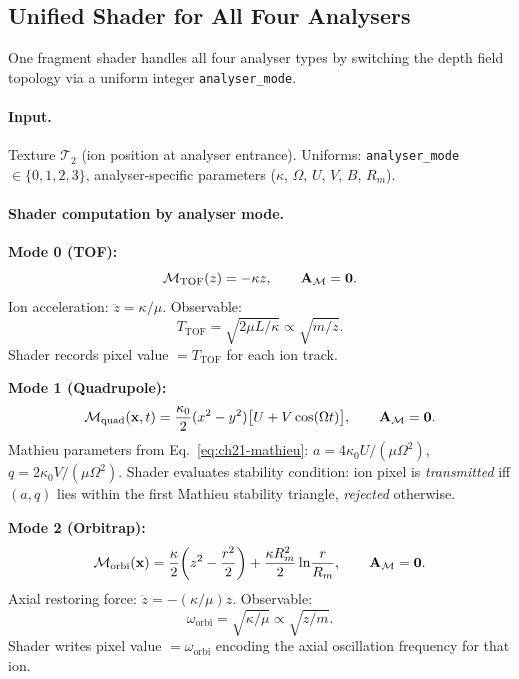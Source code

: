 \subsection{Unified Shader for All Four Analysers}

One fragment shader handles all four analyser types by switching the depth
field topology via a uniform integer \texttt{analyser\_mode}.

\paragraph{Input.}
Texture $\mathcal{T}_2$ (ion position at analyser entrance).  Uniforms:
\texttt{analyser\_mode} $\in\{0,1,2,3\}$, analyser-specific parameters
($\kappa$, $\Omega$, $U$, $V$, $B$, $R_m$).

\paragraph{Shader computation by analyser mode.}

\textbf{Mode 0 (TOF):}
\begin{equation}
  \mathcal{M}_{\mathrm{TOF}}(z) = -\kappa z, \qquad \mathbf{A}_{\mathcal{M}} = \mathbf{0}.
\end{equation}
Ion acceleration: $\ddot{z} = \kappa/\mu$.  Observable:
\begin{equation}
  T_{\mathrm{TOF}} = \sqrt{2\mu L/\kappa} \propto \sqrt{m/z}.
\end{equation}
Shader records pixel value $= T_{\mathrm{TOF}}$ for each ion track.

\textbf{Mode 1 (Quadrupole):}
\begin{equation}
  \mathcal{M}_{\mathrm{quad}}(\mathbf{x},t) = \frac{\kappa_0}{2}(x^2-y^2)
    \bigl[U + V\cos(\Omega t)\bigr], \qquad \mathbf{A}_{\mathcal{M}} = \mathbf{0}.
\end{equation}
Mathieu parameters from Eq.~\eqref{eq:ch21-mathieu}:
$a = 4\kappa_0 U/(\mu\Omega^2)$, $q = 2\kappa_0 V/(\mu\Omega^2)$.
Shader evaluates stability condition: ion pixel is \emph{transmitted} iff
$(a,q)$ lies within the first Mathieu stability triangle, \emph{rejected}
otherwise.

\textbf{Mode 2 (Orbitrap):}
\begin{equation}
  \mathcal{M}_{\mathrm{orbi}}(\mathbf{x}) = \frac{\kappa}{2}\!\left(z^2
    - \frac{r^2}{2}\right) + \frac{\kappa R_m^2}{2}\ln\!\frac{r}{R_m},
  \qquad \mathbf{A}_{\mathcal{M}} = \mathbf{0}.
\end{equation}
Axial restoring force: $\ddot{z} = -(\kappa/\mu)z$.  Observable:
\begin{equation}
  \omega_{\mathrm{orbi}} = \sqrt{\kappa/\mu} \propto \sqrt{z/m}.
\end{equation}
Shader writes pixel value $= \omega_{\mathrm{orbi}}$ encoding the axial
oscillation frequency for that ion.


